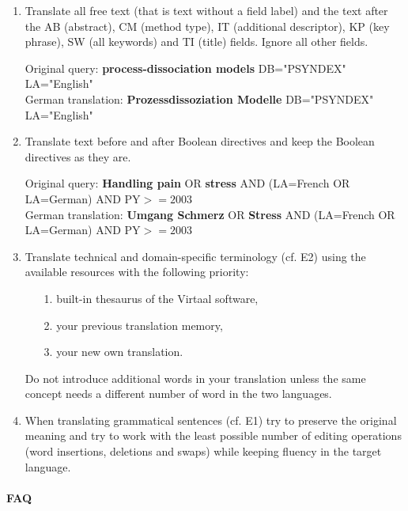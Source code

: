 \documentclass[a4paper,10pt]{article}
\newcommand{\ex}[1]{\begin{tcolorbox}[]{#1}\end{tcolorbox}}
\begin{document}
\begin{enumerate}

 \item Translate all free text (that is text without a field label) and the text after the AB (abstract), CM (method type), IT (additional descriptor), KP (key phrase), SW (all keywords) and TI (title) fields. Ignore all other fields.
 \ex{Original query: {\bf process-dissociation models} DB="PSYNDEX" LA="English" \\
     German translation: {\bf Prozessdissoziation Modelle} DB="PSYNDEX" LA="English"}

 \item Translate text before and after Boolean directives and keep the Boolean directives as they are.
 \ex{ Original query: {\bf Handling pain} OR {\bf stress} AND (LA=French OR LA=German) AND PY$>=2003$ \\
  German translation: {\bf Umgang Schmerz} OR  {\bf Stress} AND  (LA=French OR LA=German) AND PY$>=2003$}
  
 \item Translate technical and domain-specific terminology (cf. E2) using the available resources with the following priority: 
 \begin{enumerate}
 \item[1.]  built-in thesaurus of the Virtaal software, 
 \item[2.]  your previous translation memory,
 \item[3.]  your new own translation. 
 \end{enumerate}
 Do not introduce additional words in your translation unless the same concept needs a different number of word in the two languages.

 \item When translating grammatical sentences (cf. E1) try to preserve the original meaning and try to work with the least possible number of editing operations (word insertions, deletions and swaps) while keeping fluency in the target language. 

\end{enumerate}



\paragraph{FAQ}
\end{document}
